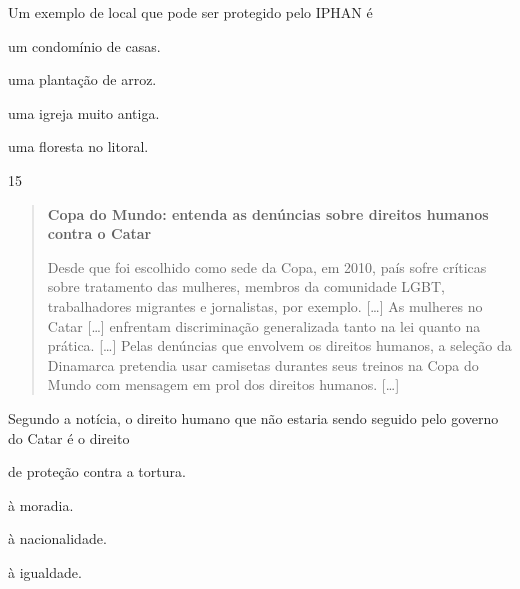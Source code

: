 \noindent{}Um exemplo de local que pode ser protegido pelo IPHAN é

\begin{minipage}{.5\textwidth}
\begin{escolha}
\item um condomínio de casas.

\item uma plantação de arroz.

\item uma igreja muito antiga.

\item uma floresta no litoral.
\end{escolha}
\end{minipage}


\num{15}

\begin{quote}
\textbf{Copa do Mundo: entenda as denúncias sobre direitos humanos contra o Catar }

Desde que foi escolhido como sede da Copa, em 2010, país sofre críticas
sobre tratamento das mulheres, membros da comunidade LGBT, trabalhadores
migrantes e jornalistas, por exemplo. {[}\ldots{}{]}
As mulheres no Catar {[}\ldots{}{]}
enfrentam discriminação generalizada tanto na lei quanto na prática. {[}\ldots{}{]}
Pelas denúncias que envolvem os direitos humanos, a seleção da Dinamarca
pretendia usar camisetas durantes seus treinos na Copa do Mundo com
mensagem em prol dos direitos humanos. {[}\ldots{}{]}

\end{quote}

Segundo a notícia, o direito humano que não estaria sendo seguido
pelo governo do Catar é o direito

\begin{minipage}{.5\textwidth}
\begin{escolha}
\item de proteção contra a tortura.

\item à moradia.

\item à nacionalidade.

\item à igualdade.
\end{escolha}
\end{minipage}
